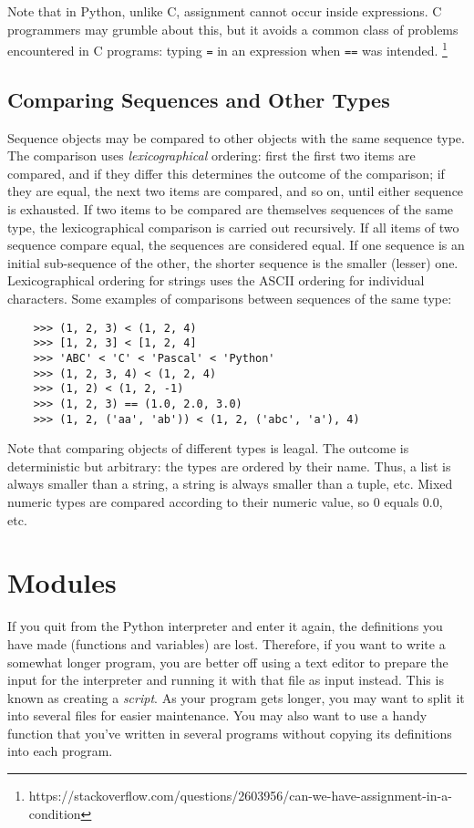 \documentclass[UTF8]{article}
\begin{document}
Note that in Python, unlike C, assignment cannot occur inside expressions. C programmers may
grumble about this, but it avoids a common class of problems encountered in C programs: typing
\texttt{=} in an expression when \texttt{==} was intended.
\footnote{https://stackoverflow.com/questions/2603956/can-we-have-assignment-in-a-condition}

\subsection{Comparing Sequences and Other Types}
Sequence objects may be compared to other objects with the same sequence type. The comparison uses
\emph{lexicographical} ordering: first the first two items are compared, and if they differ this
determines the outcome of the comparison; if they are equal, the next two items are compared, and
so on, until either sequence is exhausted. If two items to be compared are themselves sequences of
the same type, the lexicographical comparison is carried out recursively. If all items of two
sequence compare equal, the sequences are considered equal. If one sequence is an initial
sub-sequence of the other, the shorter sequence is the smaller (lesser) one. Lexicographical
ordering for strings uses the ASCII ordering for individual characters. Some examples of
comparisons between sequences of the same type:
\begin{verbatim}
    >>> (1, 2, 3) < (1, 2, 4)
    >>> [1, 2, 3] < [1, 2, 4]
    >>> 'ABC' < 'C' < 'Pascal' < 'Python'
    >>> (1, 2, 3, 4) < (1, 2, 4)
    >>> (1, 2) < (1, 2, -1)
    >>> (1, 2, 3) == (1.0, 2.0, 3.0)
    >>> (1, 2, ('aa', 'ab')) < (1, 2, ('abc', 'a'), 4)
\end{verbatim}

Note that comparing objects of different types is leagal. The outcome is deterministic but
arbitrary: the types are ordered by their name. Thus, a list is always smaller than a string, a
string is always smaller than a tuple, etc. Mixed numeric types are compared according to their
numeric value, so 0 equals 0.0, etc.

\section{Modules}
If you quit from the Python interpreter and enter it again, the definitions you have made
(functions and variables) are lost. Therefore, if you want to write a somewhat longer program, you
are better off using a text editor to prepare the input for the interpreter and running it with
that file as input instead. This is known as creating a \emph{script}. As your program gets longer,
you may want to split it into several files for easier maintenance. You may also want to use a
handy function that you've written in several programs without copying its definitions into each
program.
\end{document}
